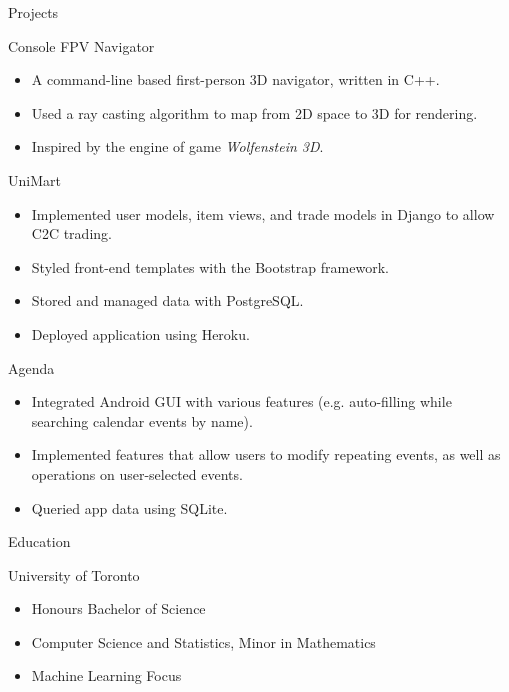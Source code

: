 \documentclass{article}
\newlength{\tabin}
\newlength{\secsep}
\newcommand{\lineunder}{\vspace*{-8pt} \\ \hspace*{-6pt} \hrulefill \\ \vspace*{-15pt}}
\newenvironment{tabbedsection}[1]{
  \begin{list}{}{
      \setlength{\itemsep}{0pt}
      \setlength{\labelsep}{0pt}
      \setlength{\labelwidth}{0pt}
      \setlength{\leftmargin}{\tabin}
      \setlength{\rightmargin}{\tabin}
      \setlength{\listparindent}{0pt}
      \setlength{\parsep}{0pt}
      \setlength{\parskip}{0pt}
      \setlength{\partopsep}{0pt}
      \setlength{\topsep}{#1}
    }
  \item[]
}{\end{list}}
\newenvironment{resume_section}[1]{
  \filbreak
  \vspace{2\secsep}
  \textsc{\large#1}
  \lineunder
  \begin{tabbedsection}{\secsep}
}{\end{tabbedsection}}
\newenvironment{resume_subsection}[2][]{
  \textbf{#2} \hfill {\footnotesize #1} \hspace{2em}
  \begin{tabbedsection}{0.5\secsep}
}{\end{tabbedsection}}
\newenvironment{subitems}{
  \renewcommand{\labelitemi}{-}
  \begin{itemize}
      \setlength{\labelsep}{1em}
}{\end{itemize}}
\begin{document}
\begin{resume_section}{Projects}

 \begin{resume_subsection}[(June 2020)]{Console FPV Navigator}
    \begin{subitems}
    \item A command-line based first-person 3D navigator, written in C++.
    \item Used a ray casting algorithm to map from 2D space to 3D for rendering.
    \item Inspired by the engine of game \textit{Wolfenstein 3D}.
    \end{subitems}
  \end{resume_subsection}

   \begin{resume_subsection}{UniMart}
    \begin{subitems}
    \item Implemented user models, item views, and trade models in Django to allow C2C trading.
    \item Styled front-end templates with the Bootstrap framework.
    \item Stored and managed data with PostgreSQL.
    \item Deployed application using Heroku.
    \end{subitems}
  \end{resume_subsection}

  \begin{resume_subsection}[(April 2020)]{Agenda}
    \begin{subitems}
      \item Integrated Android GUI with various features (e.g.
      auto-filling while searching calendar events by name).
      \item Implemented features that allow users to modify
      repeating events, as well as operations on user-selected events.
      \item Queried app data using SQLite.
    \end{subitems}
  \end{resume_subsection}


\end{resume_section}
  
  \begin{resume_section}{Education}
    \begin{resume_subsection}{University of Toronto}
      \begin{subitems}
        \item Honours Bachelor of Science
        \item Computer Science and Statistics, Minor in Mathematics
        \item Machine Learning Focus
      \end{subitems}
    \end{resume_subsection}
  \end{resume_section}
\end{document}
